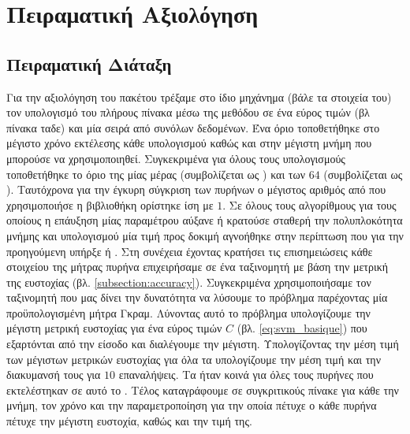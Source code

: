 \chapter{Πειραματική Αξιολόγηση}
\label{chap4}
\section{Πειραματική Διάταξη}
Για την αξιολόγηση του πακέτου  τρέξαμε στο ίδιο μηχάνημα (βάλε τα στοιχεία του) τον υπολογισμό του πλήρους  πίνακα μέσω της μεθόδου  σε ένα εύρος τιμών (βλ πίνακα ταδε) και μία σειρά από συνόλων δεδομένων.
Ένα όριο τοποθετήθηκε στο μέγιστο χρόνο εκτέλεσης κάθε υπολογισμού καθώς και στην μέγιστη μνήμη  που μπορούσε να χρησιμοποιηθεί. 
Συγκεκριμένα για όλους τους υπολογισμούς τοποθετήθηκε το όριο της μίας μέρας (συμβολίζεται ως ) και των $64$ (συμβολίζεται ως ).
Ταυτόχρονα για την έγκυρη σύγκριση των πυρήνων ο μέγιστος αριθμός από  που χρησιμοποιήσε η βιβλιοθήκη  ορίστηκε ίση με $1$.
Σε όλους τους αλγορίθμους για τους οποίους η επάυξηση μίας παραμέτρου αύξανε ή κρατούσε σταθερή την πολυπλοκότητα μνήμης και υπολογισμού μία τιμή προς δοκιμή αγνοήθηκε στην περίπτωση που για την προηγούμενη υπήρξε  ή .
Στη συνέχεια έχοντας κρατήσει τις επισημειώσεις κάθε στοιχείου της μήτρας πυρήνα επιχειρήσαμε  σε ένα ταξινομητή  με βάση την μετρική της ευστοχίας (βλ. \ref{subsection:accuracy}).
Συγκεκριμένα χρησιμοποιήσαμε τον ταξινομητή  που μας δίνει την δυνατότητα να λύσουμε το πρόβλημα  παρέχοντας μία προϋπολογισμένη μήτρα Γκραμ.
Λύνοντας αυτό το πρόβλημα υπολογίζουμε την μέγιστη μετρική ευστοχίας για ένα εύρος τιμών $C$ (βλ. \ref{eq:svm_basique}) που εξαρτόνται από την είσοδο και διαλέγουμε την μέγιστη.
Υπολογίζοντας την μέση τιμή των μέγιστων μετρικών ευστοχίας για όλα τα  υπολογίζουμε την μέση τιμή και την διακυμανσή τους για $10$ επαναλήψεις.
Τα  ήταν κοινά για όλες τους πυρήνες που εκτελέστηκαν σε αυτό το .
Τέλος καταγράφουμε σε συγκριτικούς πίνακε για κάθε  την μνήμη, τον χρόνο και την παραμετροποίηση για την οποία πέτυχε ο κάθε πυρήνα πέτυχε την μέγιστη ευστοχία, καθώς και την τιμή της.

